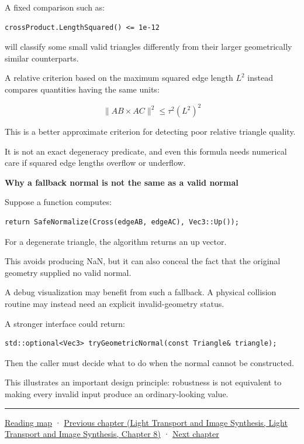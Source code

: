 A fixed comparison such as:

\begin{verbatim}
crossProduct.LengthSquared() <= 1e-12
\end{verbatim}

will classify some small valid triangles differently from their larger geometrically similar counterparts.

A relative criterion based on the maximum squared edge length \(L^2\) instead compares quantities having the same units:

\[
\boxed{ \|AB\times AC\|^2\le\tau^2(L^2)^2 }
\]

This is a better approximate criterion for detecting poor relative triangle quality.

It is not an exact degeneracy predicate, and even this formula needs numerical care if squared edge lengths overflow or underflow.

\textbf{Why a fallback normal is not the same as a valid normal}

Suppose a function computes:

\begin{verbatim}
return SafeNormalize(Cross(edgeAB, edgeAC), Vec3::Up());
\end{verbatim}

For a degenerate triangle, the algorithm returns an up vector.

This avoids producing NaN, but it can also conceal the fact that the original geometry supplied no valid normal.

A debug visualization may benefit from such a fallback. A physical collision routine may instead need an explicit invalid-geometry status.

A stronger interface could return:

\begin{verbatim}
std::optional<Vec3> tryGeometricNormal(const Triangle& triangle);
\end{verbatim}

Then the caller must decide what to do when the normal cannot be constructed.

This illustrates an important design principle: robustness is not equivalent to making every invalid input produce an ordinary-looking value.

\begin{center}\rule{0.5\linewidth}{0.5pt}\end{center}

\hyperref[volume-reading-map]{Reading map} · \href{../04-Light-Transport-and-Image-Synthesis/main.pdf\#nameddest=03-visual-computing-i-ch019-textures-as-sampled-surface-signals}{Previous chapter (Light Transport and Image Synthesis, Light Transport and Image Synthesis, Chapter 8)} · \hyperref[03-visual-computing-i-ch021-collision-implementations-and-repository-comparison]{Next chapter}
